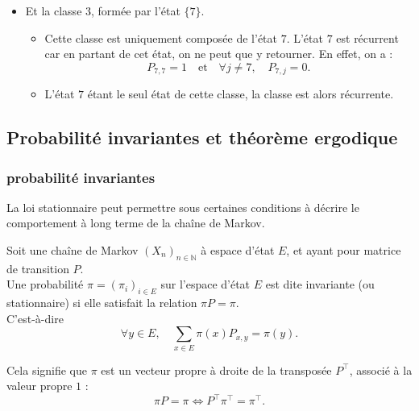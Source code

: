 \documentclass{article}
\begin{document}
\begin{tcolorbox}[colback=white,colframe=yellow!80!black,title=Exemple, breakable]
\begin{itemize}
\begin{itemize}
        \end{itemize}
    \item Et la classe 3, formée par l'état $\{7\}$.
        \begin{itemize}
            \item Cette classe est uniquement composée de l'état $7$. L'état $7$ est récurrent car en partant de cet état, on ne peut que y retourner. En effet, on a :
                \[
                P_{7,7} = 1 \quad \text{et} \quad \forall j \neq 7, \quad P_{7,j} = 0.
                \]
            \item L'état $7$ étant le seul état de cette classe, la classe est alors récurrente.
        \end{itemize}
\end{itemize}
\end{tcolorbox}


\newpage
\subsection{Probabilité invariantes et théorème ergodique}

\subsubsection{probabilité invariantes}

La loi stationnaire peut permettre sous certaines conditions à décrire le comportement à long terme de la chaîne de Markov. \\ %

\begin{tcolorbox}[colback=white,colframe=red!80!black,title=Probabilité invariantes/stationnaire]
Soit une chaîne de Markov $(X_n)_{n \in \mathbb{N}}$ à espace d'état $E$, et ayant pour matrice de transition $P$. \\

Une probabilité $\pi = (\pi_i)_{i \in E}$ sur l'espace d'état $E$ est dite invariante (ou stationnaire) si elle satisfait la relation $\pi P = \pi$. \\

C'est-à-dire
\[
\forall y \in E, \quad \sum_{x \in E} \pi(x) P_{x, y} = \pi(y).
\]
\end{tcolorbox}

Cela signifie que $\pi$ est un vecteur propre à droite de la transposée $P^{\top}$, associé à la valeur propre $1$ :
\[
\pi P = \pi \iff P^{\top} \pi^{\top} = \pi^{\top}.
\]
\end{document}
